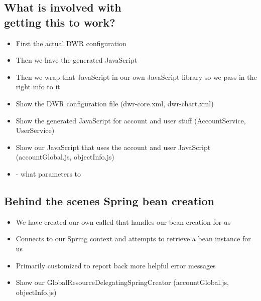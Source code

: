 \begin{ifhtml}
\begin{s5slide}
        \section{What is involved with \\getting this to work?}
            \begin{itemize}
                \item First the actual DWR configuration
                \item Then we have the generated JavaScript
                \item Then we wrap that JavaScript in our own JavaScript library so we pass in the right info to it
            \end{itemize}
        \begin{s5notes}
            \begin{itemize}
                \item Show the DWR configuration file (dwr-core.xml, dwr-chart.xml)
                \item Show the generated JavaScript for account and user stuff (AccountService, UserService)
                \item Show our JavaScript that uses the account and user JavaScript (accountGlobal.js, objectInfo.js)
                \item {} - what parameters to 
                
            \end{itemize}
        \end{s5notes}
    \end{s5slide}
    \begin{s5slide}
        \section{Behind the scenes Spring bean creation}
            \begin{itemize}
                \item We have created our own  called  that handles our bean creation for us
                \item Connects to our Spring context and attempts to retrieve a bean instance for us
                \item Primarily customized to report back more helpful error messages
            \end{itemize}
            \begin{s5notes}
                \begin{itemize}
                    \item Show our GlobalResourceDelegatingSpringCreator (accountGlobal.js, objectInfo.js)
                \end{itemize}
            \end{s5notes}
    \end{s5slide}
    \begin{s5slide}

\end{s5slide}
\end{ifhtml}
